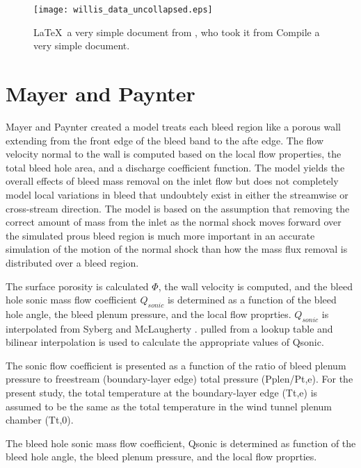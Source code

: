 \begin{figure}[htbp]
 \begin{center}
    \texttt{[image: willis\_data\_uncollapsed.eps]}
     \caption{\LaTeX\ a very simple document from \cite{Slater2012}, who took it from \cite{Willis1995} Compile a very simple document.}
     \label{fig:willis_uncollapsed}
 \end{center}
\end{figure}


\section{Mayer and Paynter}

Mayer and Paynter \cite{Mayer1994} created a model treats each bleed region like a porous wall extending from the front edge of the bleed band to the afte edge. The flow velocity normal to the wall is computed based on the local flow properties, the total bleed hole area, and a discharge coefficient function. The model yields the overall effects of bleed mass removal on the inlet flow but does not completely model local variations in bleed that undoubtely exist in either the streamwise or cross-stream direction. The model is based on the assumption that removing the correct amount of mass from the inlet as the normal shock moves forward over the simulated prous bleed region is much more important in an accurate simulation of the motion of the normal shock than how the mass flux removal is distributed over a bleed region.

The surface porosity is calculated $\Phi$, the wall velocity is computed, and the bleed hole sonic mass flow coefficient $Q_{sonic}$ is determined as a function of the bleed hole angle, the bleed plenum pressure, and the local flow proprties. $Q_{sonic}$ is interpolated from Syberg \cite{Syberg1973} and McLaugherty \cite{McLafferty1958}. pulled from a lookup table and bilinear interpolation is used to calculate the appropriate values of Qsonic.

The sonic flow coefficient is presented as a function of the ratio of bleed plenum pressure to freestream (boundary-layer edge) total pressure (Pplen/Pt,e). For the present study, the total temperature at the boundary-layer edge (Tt,e) is assumed to be the same as the total temperature in the wind tunnel plenum chamber (Tt,0).

The bleed hole sonic mass flow coefficient, Qsonic is determined as function of the bleed hole angle, the bleed plenum pressure, and the local flow proprties. 

